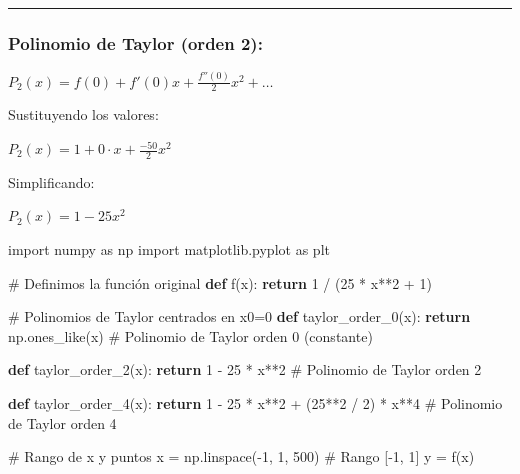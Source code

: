 \documentclass[
  letterpaper,
  DIV=11,
  numbers=noendperiod]{scrartcl}
\newenvironment{Shaded}{\begin{snugshade}}{\end{snugshade}}
\newcommand{\CommentTok}[1]{\textcolor[rgb]{0.37,0.37,0.37}{#1}}
\newcommand{\ControlFlowTok}[1]{\textcolor[rgb]{0.00,0.23,0.31}{\textbf{#1}}}
\newcommand{\DecValTok}[1]{\textcolor[rgb]{0.68,0.00,0.00}{#1}}
\newcommand{\ImportTok}[1]{\textcolor[rgb]{0.00,0.46,0.62}{#1}}
\newcommand{\KeywordTok}[1]{\textcolor[rgb]{0.00,0.23,0.31}{\textbf{#1}}}
\newcommand{\NormalTok}[1]{\textcolor[rgb]{0.00,0.23,0.31}{#1}}
\newcommand{\OperatorTok}[1]{\textcolor[rgb]{0.37,0.37,0.37}{#1}}
\begin{document}
\begin{center}\rule{0.5\linewidth}{0.5pt}\end{center}

\subsubsection{Polinomio de Taylor (orden
2):}\label{polinomio-de-taylor-orden-2}

\(P_2(x) = f(0) + f'(0)x + \frac{f''(0)}{2}x^2 + \dots\)

Sustituyendo los valores:

\(P_2(x) = 1 + 0 \cdot x + \frac{-50}{2}x^2\)

Simplificando:

\(P_2(x) = 1 - 25x^2\)

\begin{Shaded}
\begin{Highlighting}[]
\ImportTok{import}\NormalTok{ numpy }\ImportTok{as}\NormalTok{ np}
\ImportTok{import}\NormalTok{ matplotlib.pyplot }\ImportTok{as}\NormalTok{ plt}

\CommentTok{\# Definimos la función original}
\KeywordTok{def}\NormalTok{ f(x):}
    \ControlFlowTok{return} \DecValTok{1} \OperatorTok{/}\NormalTok{ (}\DecValTok{25} \OperatorTok{*}\NormalTok{ x}\OperatorTok{**}\DecValTok{2} \OperatorTok{+} \DecValTok{1}\NormalTok{)}

\CommentTok{\# Polinomios de Taylor centrados en x0=0}
\KeywordTok{def}\NormalTok{ taylor\_order\_0(x):}
    \ControlFlowTok{return}\NormalTok{ np.ones\_like(x)  }\CommentTok{\# Polinomio de Taylor orden 0 (constante)}

\KeywordTok{def}\NormalTok{ taylor\_order\_2(x):}
    \ControlFlowTok{return} \DecValTok{1} \OperatorTok{{-}} \DecValTok{25} \OperatorTok{*}\NormalTok{ x}\OperatorTok{**}\DecValTok{2}  \CommentTok{\# Polinomio de Taylor orden 2}

\KeywordTok{def}\NormalTok{ taylor\_order\_4(x):}
    \ControlFlowTok{return} \DecValTok{1} \OperatorTok{{-}} \DecValTok{25} \OperatorTok{*}\NormalTok{ x}\OperatorTok{**}\DecValTok{2} \OperatorTok{+}\NormalTok{ (}\DecValTok{25}\OperatorTok{**}\DecValTok{2} \OperatorTok{/} \DecValTok{2}\NormalTok{) }\OperatorTok{*}\NormalTok{ x}\OperatorTok{**}\DecValTok{4}  \CommentTok{\# Polinomio de Taylor orden 4}

\CommentTok{\# Rango de x y puntos}
\NormalTok{x }\OperatorTok{=}\NormalTok{ np.linspace(}\OperatorTok{{-}}\DecValTok{1}\NormalTok{, }\DecValTok{1}\NormalTok{, }\DecValTok{500}\NormalTok{)  }\CommentTok{\# Rango [{-}1, 1]}
\NormalTok{y }\OperatorTok{=}\NormalTok{ f(x)}


\end{Highlighting}
\end{Shaded}
\end{document}
